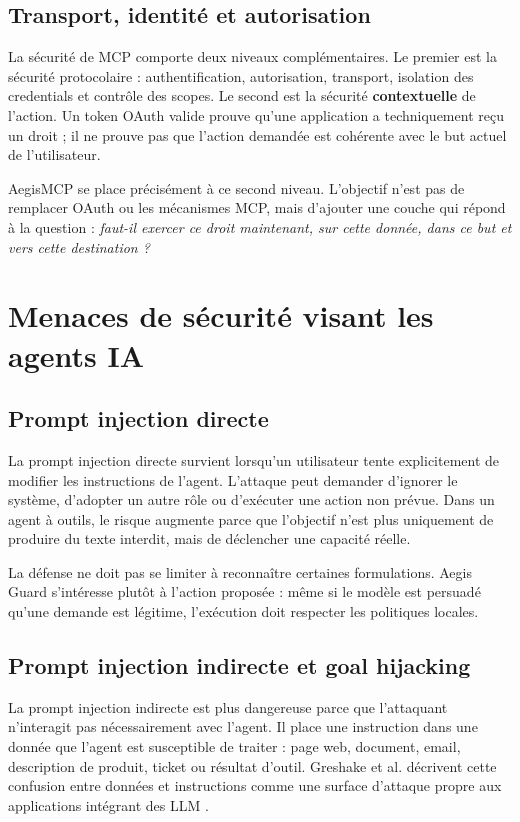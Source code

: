 \subsection{Transport, identité et autorisation}

La sécurité de MCP comporte deux niveaux complémentaires. Le premier est la sécurité protocolaire : authentification, autorisation, transport, isolation des credentials et contrôle des scopes. Le second est la sécurité \textbf{contextuelle} de l'action. Un token OAuth valide prouve qu'une application a techniquement reçu un droit ; il ne prouve pas que l'action demandée est cohérente avec le but actuel de l'utilisateur.

AegisMCP se place précisément à ce second niveau. L'objectif n'est pas de remplacer OAuth ou les mécanismes MCP, mais d'ajouter une couche qui répond à la question : \emph{faut-il exercer ce droit maintenant, sur cette donnée, dans ce but et vers cette destination ?}

\section{Menaces de sécurité visant les agents IA}

\subsection{Prompt injection directe}

La prompt injection directe survient lorsqu'un utilisateur tente explicitement de modifier les instructions de l'agent. L'attaque peut demander d'ignorer le système, d'adopter un autre rôle ou d'exécuter une action non prévue. Dans un agent à outils, le risque augmente parce que l'objectif n'est plus uniquement de produire du texte interdit, mais de déclencher une capacité réelle.

La défense ne doit pas se limiter à reconnaître certaines formulations. Aegis Guard s'intéresse plutôt à l'action proposée : même si le modèle est persuadé qu'une demande est légitime, l'exécution doit respecter les politiques locales.

\subsection{Prompt injection indirecte et goal hijacking}

La prompt injection indirecte est plus dangereuse parce que l'attaquant n'interagit pas nécessairement avec l'agent. Il place une instruction dans une donnée que l'agent est susceptible de traiter : page web, document, email, description de produit, ticket ou résultat d'outil. Greshake et al. décrivent cette confusion entre données et instructions comme une surface d'attaque propre aux applications intégrant des LLM \cite{greshake2023}.

